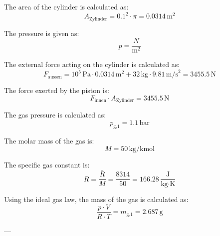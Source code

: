 The area of the cylinder is calculated as:  
\[
A_{\text{Zylinder}} = 0.1^2 \cdot \pi = 0.0314 \, \text{m}^2
\]  

The pressure is given as:  
\[
p = \frac{N}{\text{m}^2}
\]  

The external force acting on the cylinder is calculated as:  
\[
F_{\text{aussen}} = 10^5 \, \text{Pa} \cdot 0.0314 \, \text{m}^2 + 32 \, \text{kg} \cdot 9.81 \, \text{m/s}^2 = 3455.5 \, \text{N}
\]  

The force exerted by the piston is:  
\[
F_{\text{innen}} \cdot A_{\text{Zylinder}} = 3455.5 \, \text{N}
\]  

The gas pressure is calculated as:  
\[
p_{\text{g,1}} = 1.1 \, \text{bar}
\]  

The molar mass of the gas is:  
\[
M = 50 \, \text{kg/kmol}
\]  

The specific gas constant is:  
\[
R = \frac{\bar{R}}{M} = \frac{8314}{50} = 166.28 \, \frac{\text{J}}{\text{kg·K}}
\]  

Using the ideal gas law, the mass of the gas is calculated as:  
\[
\frac{p \cdot V}{R \cdot T} = m_{\text{g,1}} = 2.687 \, \text{g}
\]  

---